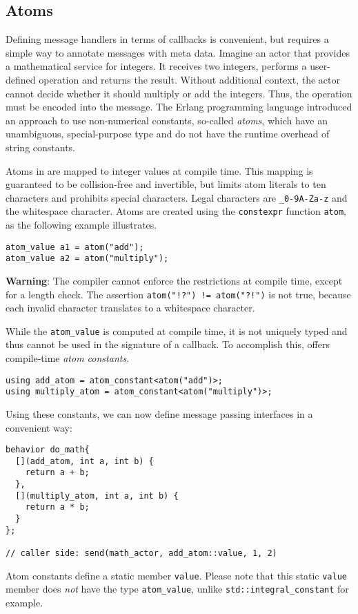 \clearpage
\subsection{Atoms}
\label{atom}

Defining message handlers in terms of callbacks is convenient, but requires a simple way to annotate messages with meta data.
Imagine an actor that provides a mathematical service for integers.
It receives two integers, performs a user-defined operation and returns the result.
Without additional context, the actor cannot decide whether it should multiply or add the integers.
Thus, the operation must be encoded into the message.
The Erlang programming language introduced an approach to use non-numerical
constants, so-called \textit{atoms}, which have an unambiguous, special-purpose type and do not have the runtime overhead of string constants.

Atoms in \lib are mapped to integer values at compile time.
This mapping is guaranteed to be collision-free and invertible, but limits atom literals to ten characters and prohibits special characters.
Legal characters are \lstinline^_0-9A-Za-z^ and the whitespace character.
Atoms are created using the \lstinline^constexpr^ function \lstinline^atom^, as the following example illustrates.

\begin{lstlisting}
atom_value a1 = atom("add");
atom_value a2 = atom("multiply");
\end{lstlisting}

\textbf{Warning}: The compiler cannot enforce the restrictions at compile time, except for a length check.
The assertion \lstinline^atom("!?") != atom("?!")^ is not true, because each invalid character translates to a whitespace character.

While the \lstinline^atom_value^ is computed at compile time, it is not uniquely typed and thus cannot be used in the signature of a callback.
To accomplish this, \lib offers compile-time \emph{atom constants}.

\begin{lstlisting}
using add_atom = atom_constant<atom("add")>;
using multiply_atom = atom_constant<atom("multiply")>;
\end{lstlisting}

Using these constants, we can now define message passing interfaces in a convenient way:

\begin{lstlisting}
behavior do_math{
  [](add_atom, int a, int b) {
    return a + b;
  },
  [](multiply_atom, int a, int b) {
    return a * b;
  }
};

// caller side: send(math_actor, add_atom::value, 1, 2)
\end{lstlisting}

Atom constants define a static member \lstinline^value^.
Please note that this static \lstinline^value^ member does \emph{not} have the type \lstinline^atom_value^, unlike \lstinline^std::integral_constant^ for example.
